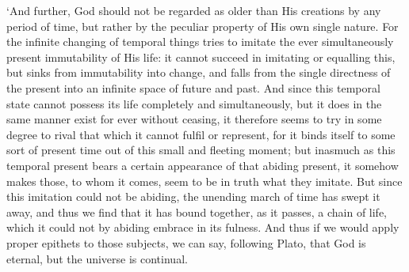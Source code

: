 `And further, God should not be regarded as older than His creations
by any period of time, but rather by the peculiar property of His own
single nature. For the infinite changing of temporal things tries to
imitate the ever simultaneously present immutability of His life: it
cannot succeed in imitating or equalling this, but sinks from
immutability into change, and falls from the single directness of the
present into an infinite space of future and past. And since this
temporal state cannot possess its life completely and simultaneously,
but it does in the same manner exist for ever without ceasing, it
therefore seems to try in some degree to rival that which it cannot
fulfil or represent, for it binds itself to some sort of present time
out of this small and fleeting moment; but inasmuch as this temporal
present bears a certain appearance of that abiding present, it somehow
makes  those, to whom it comes, seem to be in truth what
they imitate. But since this imitation could not be abiding, the
unending march of time has swept it away, and thus we find that it has
bound together, as it passes, a chain of life, which it could not by
abiding embrace in its fulness. And thus if we would apply proper
epithets to those subjects, we can say, following Plato, that God is
eternal, but the universe is continual.

